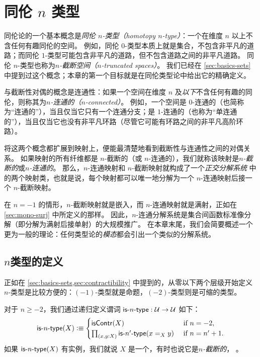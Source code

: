 \chapter{同伦 \texorpdfstring{$n$}{n} 类型}
\label{cha:hlevels}

%

同伦论的一个基本概念是\emph{同伦 $n$-类型（homotopy $n$-type）}：一个在维度 $n$ 以上不含任何有趣同伦的空间。
例如，同伦 $0$-类型本质上就是集合，不包含非平凡的道路；而同伦 $1$-类型可能包含非平凡的道路，但不包含道路之间的非平凡道路。
同伦 $n$-类型也称为\emph{$n$-截断空间（$n$-truncated spaces）}。
我们已经在 \cref{sec:basics-sets} 中提到过这个概念；本章的第一个目标就是在同伦类型论中给出它的精确定义。

与截断性对偶的概念是连通性：如果一个空间在维度 $n$ 及\emph{以下}不含任何有趣的同伦，则称其为\emph{$n$-连通的（$n$-connected）}。
例如，一个空间是 $0$-连通的（也简称为``连通的''），当且仅当它只有一个连通分支；是 $1$-连通的（也称为``单连通的''），当且仅当它也没有非平凡环路（尽管它可能有环路之间的非平凡高阶环路）。

将这两个概念都扩展到映射上，便能最清楚地看到截断性与连通性之间的对偶关系。
如果映射的所有纤维都是 $n$-截断的（或 $n$-连通的），我们就称该映射是\emph{$n$-截断的}或\emph{$n$-连通的}。
那么，$n$-连通映射和 $n$-截断映射就构成了一个\emph{正交分解系统}
中的两个映射类，也就是说，每个映射都可以唯一地分解为一个 $n$-连通映射后接一个 $n$-截断映射。

在 $n={-1}$ 的情形，$n$-截断映射就是嵌入，而 $n$-连通映射就是满射，正如在 \cref{sec:mono-surj} 中所定义的那样。
因此，$n$-连通分解系统是集合间函数标准像分解（即分解为满射后接单射）的大规模推广。
在本章末尾，我们会简要概述一个更为一般的理论：任何类型论的\emph{模态}都会引出一个类似的分解系统。

\section{\texorpdfstring{$n$}{n}类型的定义}
\label{sec:n-types}

正如在 \cref{sec:basics-sets,sec:contractibility} 中提到的，从零以下两个层级开始定义 $n$-类型是比较方便的：$(-1)$-类型就是命题，$(-2)$-类型则是可缩的类型。

\begin{defn}\label{def:hlevel}
  对于 $n \geq -2$，我们通过递归定义谓词 $\mathsf{is}\mbox{-}{n}\mbox{-}\mathsf{type} : \mathcal{U} \to \mathcal{U}$ 如下：
  \[ \istype{n}(X) \defeq
  \begin{cases}
    \iscontr(X) & \text{ if } n = -2, \\
    \prd{x,y : X} \istype{n'}(\id[X]{x}{y}) & \text{ if } n = n'+1.
  \end{cases}
  \]
  如果 $\mathsf{is}\mbox{-}{n}\mbox{-}\mathsf{type}(X)$ 有实例，我们就说 $X$ 是一个，有时也说它是\emph{$n$-截断的}，
  。%
\end{defn}

